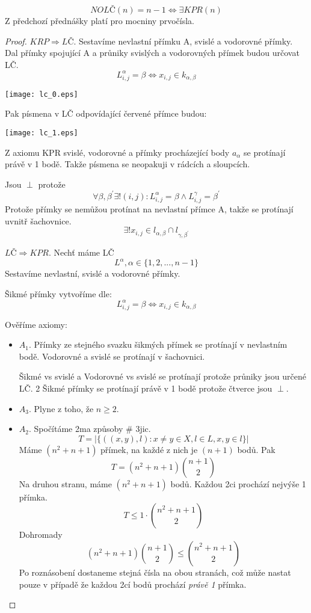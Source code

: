 \begin{theorem}
	\[ NOLČ(n) = n - 1 \iff \exists KPR(n) \]
	Z předchozí přednášky platí pro mocniny prvočísla.
\end{theorem}
\begin{proof}
	$KRP \Rightarrow LČ$. Sestavíme nevlastní přímku A, svislé a vodorovné přímky.
	Dal přímky spojující A a průniky svislých a vodorovných přímek budou určovat LČ.
	\[ L^{\alpha}_{i,j} = \beta \iff x_{i,j} \in k_{\alpha, \beta} \]

	\texttt{[image: lc\_0.eps]}

	Pak písmena v LČ odpovídající červené přímce budou:

	\texttt{[image: lc\_1.eps]}

	Z axiomu KPR svislé, vodorovné a přímky procházející body $a_{\alpha}$ se protínají právě v 1 bodě.
	Takže písmena se neopakuji v rádcích a sloupcích.

	Jsou $\perp$ protože
	\[ \forall \beta, \beta^{\prime} \exists ! (i, j): L^{\alpha}_{i, j} = \beta \land L^{\gamma}_{i,j} = \beta^{\prime} \]
	Protože přímky se nemůžou protínat na nevlastní přímce A, takže se protínají uvnitř šachovnice.
	\[ \exists ! x_{i, j} \in l_{\alpha, \beta} \cap l_{\gamma, \beta^{\prime}} \]

	$LČ \Rightarrow KPR$. Nechť máme LČ
	\[ L^{\alpha}, \alpha \in \{ 1, 2, ... ,n - 1 \} \]
	Sestavíme nevlastní, svislé a vodorovné přímky.

	Šikmé přímky vytvoříme dle:
	\[ L^{\alpha}_{i,j} = \beta \iff x_{i,j} \in k_{\alpha, \beta} \]

	Ověříme axiomy:
	\begin{itemize}
		\item $A_1$. Přímky ze stejného svazku šikmých přímek se protínají v nevlastním bodě.
			Vodorovné a svislé se protínají v šachovnici.

			Šikmé vs svislé a Vodorovné vs svislé se protínají protože průniky jsou určené LČ.
			2 Šikmé přímky se protínají právě v 1 bodě protože čtverce jsou $\perp$.
		\item $A_3$. Plyne z toho, že $n \geq 2$.
		\item $A_2$. Spočítáme 2ma způsoby \# 3jic.
			\[ T = |\{ ((x,y), l): x \ne y \in X, l \in L, x,y \in l \}| \]
			Máme $(n^2 + n + 1)$ přímek, na každé z nich je $(n + 1)$ bodů. Pak
			\[ T = (n^2 + n + 1) \binom{n + 1}{2} \]
			Na druhou stranu, máme $(n^2 + n + 1)$ bodů. Každou 2ci prochází nejvýše 1 přímka.
			\[ T \leq 1 \cdot \binom{n^2 + n + 1}{2} \]
			Dohromady
			\[ (n^2 + n + 1) \binom{n + 1}{2} \leq \binom{n^2 + n + 1}{2} \]
			Po roznásobení dostaneme stejná čísla na obou stranách, což může nastat pouze v případě že každou 2cí bodů prochází \emph{právě 1} přímka.
	\end{itemize}
\end{proof}

